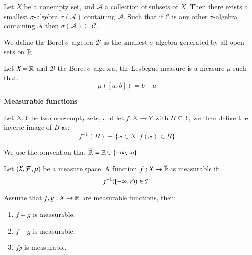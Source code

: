 \begin{proposition}
Let $X$ be a nonempty set, and $\mathcal{A}$ a collection of subsets of $X$. Then there exists a smallest $\sigma$-algebra $\sigma(\mathcal{A})$ containing $\mathcal{A}$. Such that if $\mathcal{C}$ is any other $\sigma$-algebra containing $\mathcal{A}$ then $\sigma(\mathcal{A}) \subseteq \mathcal{C}$. 
\end{proposition}

\begin{definition}
We define the Borel $\sigma$-algebra $\mathcal{B}$ as the smallest $\sigma$-algebra generated by all open sets on $\mathbb{R}$.
\end{definition}

\begin{example}
Let $X = \mathbb{R}$ and $\mathcal{B}$ the Borel $\sigma$-algebra, the Lesbegue measure is a measure $\mu$ such that: 
\[
\mu([a,b]) = b-a
\]
\end{example}



\centerline{\textbf{Measurable functions}}
\begin{definition}
Let $X,Y$ be two non-empty sets, and let $f:X\to Y$ with $B\subseteq Y$, we then define the inverse image of $B$ as: 
\[f^{-1}(B) = \{x\in X: f(x)\in B\}
\]
\end{definition} 

We use the convention that $\overline{\mathbb{R}} = \mathbb{R}\cup \{-\infty, \infty\}$ 


\begin{definition}
Let $(X, \mathcal{F}, \mu)$ be a measure space. A function $f:X \to \overline{\mathbb{R}}$ is measurable if:
\begin{align*}
f^{-1}([-\infty, r)) \in \mathcal{F}   
\end{align*}
\end{definition}

\begin{proposition}
Assume that $f,g:X\to \mathbb{R}$ are measurable functions, then: 
\begin{enumerate}[label = (\roman*), leftmargin=*]
    \item $f+g$ is measurable.
    \item $f-g$ is measurable. 
    \item $fg$  is measurable.
\end{enumerate}
\end{proposition}


